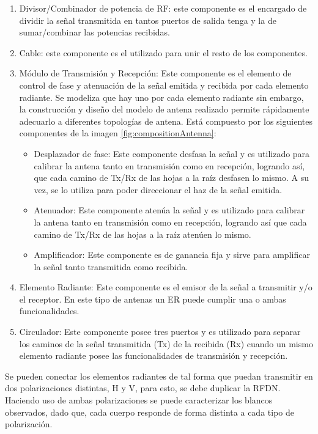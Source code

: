 \begin{enumerate}
	\item Divisor/Combinador de potencia de RF: este componente es el encargado de dividir la señal transmitida en tantos puertos 
		de salida tenga y la de sumar/combinar las potencias recibidas.
	\item Cable: este componente es el utilizado para unir el resto de los componentes.
	\item Módulo de Transmisión y Recepción: Este componente es el elemento de control de fase y atenuación de la señal emitida y
		recibida por cada elemento radiante. Se modeliza que hay uno por cada elemento radiante sin embargo, la construcción y 
		diseño del modelo de antena realizado permite rápidamente adecuarlo a diferentes topologías de antena. Está compuesto por 
		los siguientes componentes de la imagen \ref{fig:compositionAntenna}:
		\begin{itemize}
			\item Desplazador de fase: Este componente desfasa la señal y es utilizado para calibrar la antena tanto en transmisión como
				en recepción, logrando así, que cada camino de Tx/Rx de las hojas a la raíz desfasen lo mismo. A su vez, se lo utiliza 
				para poder direccionar el haz de la señal emitida.
			\item Atenuador: Este componente atenúa la señal y es utilizado para calibrar la antena tanto en transmisión como en 
				recepción, logrando así que cada camino de Tx/Rx de las hojas a la raíz atenúen lo mismo. 
			\item Amplificador: Este componente es de ganancia fija y sirve para amplificar la señal tanto transmitida como recibida. 
		\end{itemize}
	\item Elemento Radiante: Este componente es el emisor de la señal a transmitir y/o el receptor. En este tipo de antenas un
		ER puede cumplir una o ambas funcionalidades.
	\item Circulador: Este componente posee tres puertos y es utilizado para separar los caminos de la señal transmitida (Tx) de 
		la recibida (Rx) cuando un mismo elemento radiante posee las funcionalidades de transmisión y recepción. 
\end{enumerate}

Se pueden conectar los elementos radiantes de tal forma que puedan transmitir en dos polarizaciones distintas, H y V, para esto,
se debe duplicar la RFDN. Haciendo uso de ambas polarizaciones se puede caracterizar los blancos observados, dado que, cada
cuerpo responde de forma distinta a cada tipo de polarización.

